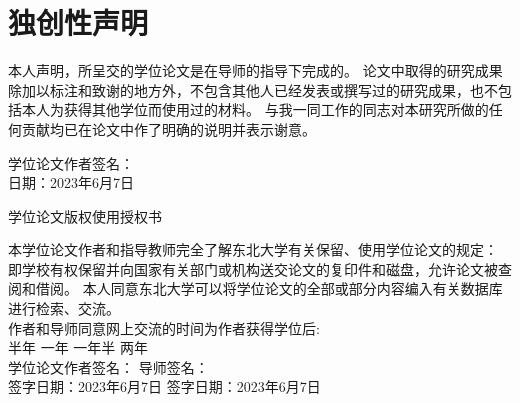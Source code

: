 \chapter*{独创性声明}
\thispagestyle{独创性声明}
\begin{zihao}{4}
{
\linespread{2}\selectfont
本人声明，所呈交的学位论文是在导师的指导下完成的。
论文中取得的研究成果除加以标注和致谢的地方外，不包含其他人已经发表或撰写过的研究成果，也不包括本人为获得其他学位而使用过的材料。
与我一同工作的同志对本研究所做的任何贡献均已在论文中作了明确的说明并表示谢意。
\begin{flushright}
    学位论文作者签名：\hspace*{5em} \\
    日\hspace*{3.73em}期：2023年6月7日
\end{flushright}
}
\end{zihao}
\vspace{2ex}
\begin{center}
    {\heiti {} \selectfont 
    学位论文版权使用授权书}
\end{center}
\par
\begin{zihao}{4}
    {
    \linespread{2}\selectfont
    本学位论文作者和指导教师完全了解东北大学有关保留、使用学位论文的规定：
    即学校有权保留并向国家有关部门或机构送交论文的复印件和磁盘，允许论文被查阅和借阅。
    本人同意东北大学可以将学位论文的全部或部分内容编入有关数据库进行检索、交流。\\[2em]
    作者和导师同意网上交流的时间为作者获得学位后:\\
    半年{\LARGE{\Square}} \hfill 一年{\LARGE{\Square}} \hfill 一年半{\LARGE{\Square}} \hfill 两年{\LARGE{\CheckedBox}} \\[1em]
    学位论文作者签名：\hspace*{8ex} \hfill 导师签名：\hspace*{7.25em} \\
    签字日期：2023年6月7日 \hfill 签字日期：2023年6月7日\par
    }
\end{zihao}
\newpage
\quad
\newpage